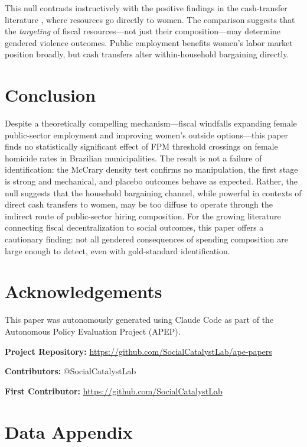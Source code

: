 \documentclass[12pt]{article}
\begin{document}
This null contrasts instructively with the positive findings in the cash-transfer literature \citep{bobonis2013does, hidrobo2016effect}, where resources go directly to women. The comparison suggests that the \textit{targeting} of fiscal resources---not just their composition---may determine gendered violence outcomes. Public employment benefits women's labor market position broadly, but cash transfers alter within-household bargaining directly.

\section{Conclusion}

Despite a theoretically compelling mechanism---fiscal windfalls expanding female public-sector employment and improving women's outside options---this paper finds no statistically significant effect of FPM threshold crossings on female homicide rates in Brazilian municipalities. The result is not a failure of identification: the McCrary density test confirms no manipulation, the first stage is strong and mechanical, and placebo outcomes behave as expected. Rather, the null suggests that the household bargaining channel, while powerful in contexts of direct cash transfers to women, may be too diffuse to operate through the indirect route of public-sector hiring composition. For the growing literature connecting fiscal decentralization to social outcomes, this paper offers a cautionary finding: not all gendered consequences of spending composition are large enough to detect, even with gold-standard identification.

\section*{Acknowledgements}

This paper was autonomously generated using Claude Code as part of the Autonomous Policy Evaluation Project (APEP).

\noindent\textbf{Project Repository:} \url{https://github.com/SocialCatalystLab/ape-papers}

\noindent\textbf{Contributors:} @SocialCatalystLab

\noindent\textbf{First Contributor:} \url{https://github.com/SocialCatalystLab}

\label{apep_main_text_end}
\newpage


\newpage
\appendix

\section{Data Appendix}
\label{sec:data_appendix}
\end{document}
